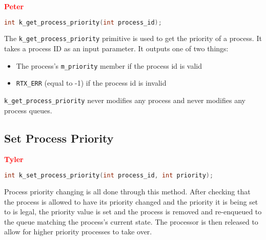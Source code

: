 \documentclass[12pt]{report}
\begin{document}
\textcolor{red}{\textbf{Peter}} \\

\begin{minipage}{\textwidth}
\begin{lstlisting}[language=C, frame=single]
int k_get_process_priority(int process_id);
\end{lstlisting}
\end{minipage}

The {\tt k\_get\_process\_priority} primitive is used to get the priority of a process. It takes a process ID as an input parameter. It outputs one of two things:\\

\begin{itemize}
\item The process's {\tt m\_priority} member if the process id is valid
\item {\tt RTX\_ERR} (equal to -1) if the process id is invalid
\end{itemize}

{\tt k\_get\_process\_priority} never modifies any process and never modifies any process queues.\\

\subsection{Set Process Priority}

\textcolor{red}{\textbf{Tyler}} \\
\begin{minipage}{\textwidth}
\begin{lstlisting}[language=C, frame=single]
int k_set_process_priority(int process_id, int priority);
\end{lstlisting}
\end{minipage}

Process priority changing is all done through this method. After checking that the process is allowed to have its priority changed and the priority it is being set to is legal, the priority value is set and the process is removed and re-enqueued to the queue matching the process's current state. The processor is then released to allow for higher priority processes to take over.

\begin{algorithm}
  \caption{The process priority changing function}
  \begin{algorithmic}[1]
		\EndIf
    \EndProcedure
  \end{algorithmic}
\end{algorithm}
\end{document}
